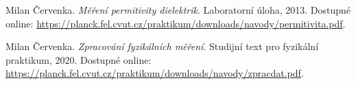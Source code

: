 \documentclass[a4paper,12pt]{article}
\begin{document}
\begin{thebibliography}{}

    Milan Červenka. \textit{Měření permitivity dielektrik}. Laboratorní úloha, 2013. Dostupné online: \url{https://planck.fel.cvut.cz/praktikum/downloads/navody/permitivita.pdf}.

    Milan Červenka. \textit{Zpracování fyzikálních měření}. Studijní text pro fyzikální praktikum, 2020. Dostupné online: \url{https://planck.fel.cvut.cz/praktikum/downloads/navody/zpracdat.pdf}.

\end{thebibliography}
\end{document}
